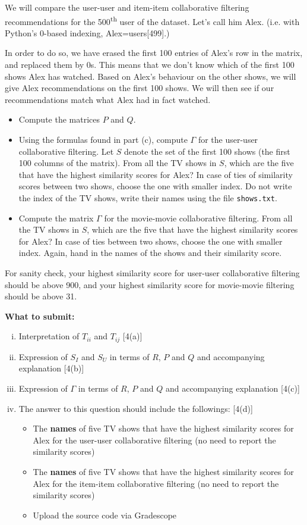 We will compare the user-user and item-item collaborative filtering
recommendations for the 500\textsuperscript{th} user of the dataset. Let's call him Alex. (i.e. with Python's 0-based indexing, Alex=users[499].)

In order to do so, we have erased the first 100 entries of Alex's row in the
matrix, and replaced them by 0s. This means that we don't know which of the
first 100 shows Alex has watched. Based on Alex's behaviour on the other shows, we will give Alex recommendations on the first 100 shows. We will then see if our recommendations match what Alex had in fact watched.

\begin{itemize}
\item Compute the matrices $P$ and $Q$.
\item Using the formulas found in part (c), compute $\Gamma$ for the user-user
collaborative filtering. Let $S$ denote the set of the first 100 shows (the
first 100 columns of the matrix). From all the TV shows in $S$, which are the
five that have the highest similarity scores for Alex? In case of ties of similarity scores between two shows, choose the one with smaller index. Do not write the
index of the TV shows, write their names using the file \verb+shows.txt+.
\item Compute the matrix $\Gamma$ for the movie-movie collaborative filtering.
From all the TV shows in $S$, which are the five that have the highest similarity scores for
Alex? In case of ties between two shows, choose the one with smaller index.
Again, hand in the names of the shows and their similarity score.
\end{itemize}

For sanity check, your highest similarity score for user-user collaborative filtering should be above 900, and your highest similarity score for movie-movie filtering should be above 31. 

{\bf What to submit:} 
\begin{enumerate}[(i)]
\item Interpretation of $T_{ii}$ and $T_{ij}$ [4(a)]
\item Expression of $S_I$ and $S_U$ in terms of $R$, $P$ and $Q$ and accompanying explanation [4(b)]
\item Expression of $\Gamma$ in terms of $R$, $P$ and $Q$ and accompanying explanation [4(c)]
\item The answer to this question should include the followings: [4(d)]
\begin{itemize}
\item The \textbf{names} of five TV shows that have the highest similarity scores for Alex for the user-user collaborative filtering (no need to report the similarity scores)
\item The \textbf{names} of five TV shows that have the highest similarity scores for Alex for the item-item collaborative filtering (no need to report the similarity scores)
\item Upload the source code via Gradescope
\end{itemize}
\end{enumerate}